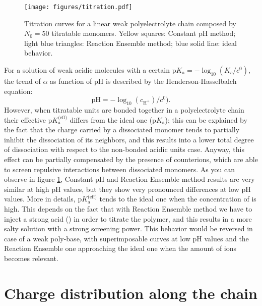 \documentclass[
a4paper,                        %
11pt,                           %
twoside,                        %
footsepline,                    %
headsepline,                    %
headexclude,                    %
footexclude,                    %
pagesize,                       %
]{scrartcl}
\begin{document}
\begin{figure}[h]
	\centering
	\texttt{[image: figures/titration.pdf]}
	\caption{Titration curves for a linear weak polyelectrolyte chain composed by $N_0=50$ titratable monomers. Yellow squares: Constant pH method; light blue triangles: Reaction Ensemble method; blue solid line: ideal behavior.}
	\label{titration}
\end{figure}
For a solution of weak acidic molecules with a certain $\text{p}K_\text{a}=-\log_{10}(K_c/c^0)$, the trend of $\alpha$ as function of pH is described by the Henderson-Hasselbalch equation:
\begin{equation}
\text{pH} = -\log_{10}(c_{\text{H}^+})/c^0).
\end{equation}
However, when titratable units are bonded together in a polyelectrolyte chain their effective $\text{p}K_\text{a}^\text{(eff)}$ differs from the ideal one ($\text{p}K_\text{a}$); this can be explained by the fact that the charge carried by a dissociated monomer tends to partially inhibit the dissociation of its neighbors, and this results into a lower total degree of dissociation with respect to the non-bonded acidic units case. Anyway, this effect can be partially compensated by the presence of counterions, which are able to  screen repulsive interactions between dissociated monomers. As you can observe in figure \ref{titration}, Constant pH and Reaction Ensemble method results are very similar at high pH values, but they show very pronounced differences at low pH values. More in details, $\text{p}K_\text{a}^\text{(eff)}$ tends to the ideal one when the concentration of  is high. This depends on the fact that with Reaction Ensemble method we have to inject a strong acid () in order to titrate the polymer, and this results in a more salty solution with a strong screening power. This behavior would be reversed in case of a weak poly-base, with superimposable curves at low pH values and the Reaction Ensemble one approaching the ideal one when the amount of  ions becomes relevant.
 

\section{Charge distribution along the chain}
\end{document}
